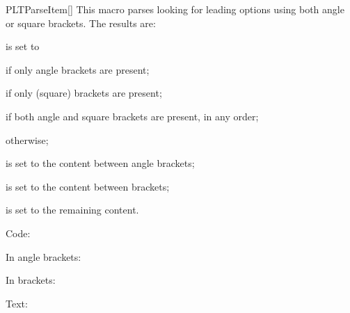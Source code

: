 \documentclass[a4paper, 11pt]{article}
\begin{document}
\begin{macro}{PLTParseItem}[]
    This macro parses  looking for leading options using both angle or square brackets. The results are:
    \begin{itemizeitemize}
        \item {} is set to
        \begin{itemizeitemize}
            \item {} if only angle brackets are present;
            \item {} if only (square) brackets are present;
            \item {} if both angle and square brackets are present, in any order;
            \item {} otherwise;
        \end{itemizeitemize}
        \item {} is set to the content between angle brackets;
        \item {} is set to the content between brackets;
        \item {} is set to the remaining content.
    \end{itemizeitemize}
\end{macro}

\begin{example}{}
    \noindent Code: \texttt{\opttype}\par
    In angle brackets: \texttt{\angleopts}\par
    In brackets: \texttt{\bracketopts}\par
    Text: \texttt{\body}\par
\end{example}
\end{document}
